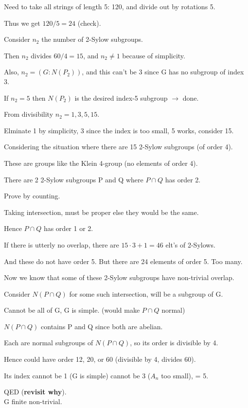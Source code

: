 \documentclass[12pt]{article}
\begin{document}
Need to take all strings of length 5: 120, and divide out by rotations 5.

Thus we get $120 \slash 5 = 24$ (check).

Consider $n_2$ the number of 2-Sylow subgroups.

Then $n_2$ divides $60/4 = 15$, and $n_2 \neq 1$ because of simplicity.

Also, $n_2 = (G : N(P_2))$, and this can't be 3 since G has no subgroup of index 3.

If $n_2 = 5$ then $N(P_2)$ is the desired index-5 subgroup $\to$ done.

From divisibility $n_2 = 1, 3, 5, 15$.

Elminate 1 by simplicity, 3 since the index is too small, 5 works, consider 15.

\noindent
Considering the situation where there are 15 2-Sylow subgroups (of order 4).

These are groups like the Klein 4-group (no elements of order 4).

There are 2 2-Sylow subgroups P and Q where $P \cap Q$ has order 2.

Prove by counting.

Taking intersection, must be proper else they would be the same.

Hence $P \cap Q$ has order 1 or 2.

If there is utterly no overlap, there are $15 \cdot 3 + 1 = 46$ elt's of 2-Sylows.

And these do not have order 5.  But there are 24 elements of order 5.  Too many.

\noindent
Now we know that some of these 2-Sylow subgroups have non-trivial overlap.

Consider $N(P \cap Q)$ for some such intersection, will be a subgroup of G.

Cannot be all of G, G is simple. (would make $P \cap Q$ normal)

$N(P \cap Q)$ contains P and Q since both are abelian.

Each are normal subgroups of $N(P \cap Q)$, so its order is divisible by 4.

Hence could have order 12, 20, or 60 (divisible by 4, divides 60).

Its index cannot be 1 (G is simple) cannot be 3 ($A_n$ too small), = 5.

QED (\textbf{revisit why}).\\

\noindent
G finite non-trivial.
\end{document}
